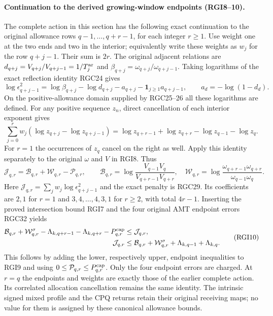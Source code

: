 \documentclass[11pt,a4paper]{article}
\begin{document}
\paragraph{Continuation to the derived growing-window endpoints (RGI8--10).}
The complete action in this section has the following exact continuation to
the original allowance rows $q-1,\ldots,q+r-1$, for each integer $r\ge1$.
Use weight one at the two ends and two in the interior; equivalently write
these weights as $w_j$ for the row $q+j-1$.  Their sum is $2r$.  The original
adjacent relations are
$d_{q+j}=V_{q+j}/V_{q+j-1}=1/T_j^{\rm ar}$ and
$\beta_{q+j}=\omega_{q+j}/\omega_{q+j-1}$.  Taking logarithms of the exact
reflection identity RGC24 gives
\begin{equation}
 \log\epsilon_{q+j-1}^2
 =\log\beta_{q+j}-\log d_{q+j}-a_{q+j}
       -\boldsymbol1_{j\ge1}a_{q+j-1},\qquad
 a_d=-\log(1-d_d).
 \tag{RGI8}\label{RGI:rowaction}
\end{equation}
On the positive-allowance domain supplied by RGC25--26 all these logarithms
are defined.  For any positive sequence $z_n$, direct cancellation of each
interior exponent gives
\[
 \sum_{j=0}^{r}w_j(\log z_{q+j}-\log z_{q+j-1})
 =\log z_{q+r-1}+\log z_{q+r}-\log z_{q-1}-\log z_q.
\]
For $r=1$ the occurrences of $z_q$ cancel on the right as well.  Apply this
identity separately to the original $\omega$ and $V$ in RGI8.  Thus
\begin{equation}
 \mathcal J_{q,r}=\mathcal B_{q,r}+\mathcal W_{q,r}-\mathcal P_{q,r},
 \qquad
 \mathcal B_{q,r}=\log\frac{V_{q-1}V_q}{V_{q+r-1}V_{q+r}},\quad
 \mathcal W_{q,r}=\log\frac{\omega_{q+r-1}\omega_{q+r}}
                              {\omega_{q-1}\omega_q}.
 \tag{RGI9}\label{RGI:action}
\end{equation}
Here $\mathcal J_{q,r}=\sum_jw_j\log\epsilon_{q+j-1}^2$ and the exact penalty
is RGC29.  Its coefficients are $2,1$ for $r=1$ and
$3,4,\ldots,4,3,1$ for $r\ge2$, with total $4r-1$.
Inserting the proved intersection bound RGI7 and the four original AMT
endpoint errors RGC32 yields
\begin{equation}
 \begin{split}
 \mathcal B_{q,r}+\mathcal W^\sigma_{q,r}
 -\Lambda_{k,q+r-1}-\Lambda_{k,q+r}-P_{q,r}^{\rm cap}
 &\le\mathcal J_{q,r},\\
 \mathcal J_{q,r}
 &\le\mathcal B_{q,r}+\mathcal W^\sigma_{q,r}
           +\Lambda_{k,q-1}+\Lambda_{k,q}.
 \end{split}
 \tag{RGI10}\label{RGI:actionbounds}
\end{equation}
This follows by adding the lower, respectively upper, endpoint inequalities
to RGI9 and using $0\le\mathcal P_{q,r}\le P_{q,r}^{\rm cap}$.
Only the four endpoint errors are charged.  At $r=q$ the endpoints and
weights are exactly those of the earlier complete action.  Its correlated
allocation cancellation remains the same identity.  The intrinsic signed
mixed profile and the CPQ returns retain their original receiving maps; no
value for them is assigned by these canonical allowance bounds.
\end{document}
